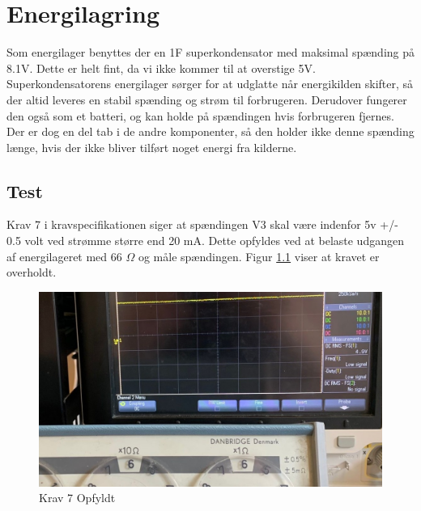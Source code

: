 \documentclass[../main.tex]{subfiles}
\begin{document}
\chapter{Energilagring } \label{Chap:Energilagring}
Som energilager benyttes der en 1F superkondensator med maksimal spænding på 8.1V. Dette er helt fint, da vi ikke kommer til at overstige 5V. Superkondensatorens energilager sørger for at udglatte når energikilden skifter, så der altid leveres en stabil spænding og strøm til forbrugeren. Derudover fungerer den også som et batteri, og kan holde på spændingen hvis forbrugeren fjernes. Der er dog en del tab i de andre komponenter, så den holder ikke denne spænding længe, hvis der ikke bliver tilført noget energi fra kilderne.

\section{Test}
Krav 7 i kravspecifikationen siger at spændingen V3 skal være indenfor 5v +/- 0.5 volt ved strømme større end 20 mA. Dette opfyldes ved at belaste udgangen af energilageret med 66 $\Omega$ og måle spændingen. Figur \ref{fig: Krav 7 Opfyldt} viser at kravet er overholdt.

\begin{figure}[H]
      \includegraphics[width=\textwidth]{Dokumentation/Pictures/Krav7.jpg}
     \caption{Krav 7 Opfyldt}
     \label{fig: Krav 7 Opfyldt}
     \end{figure}
\end{document}
